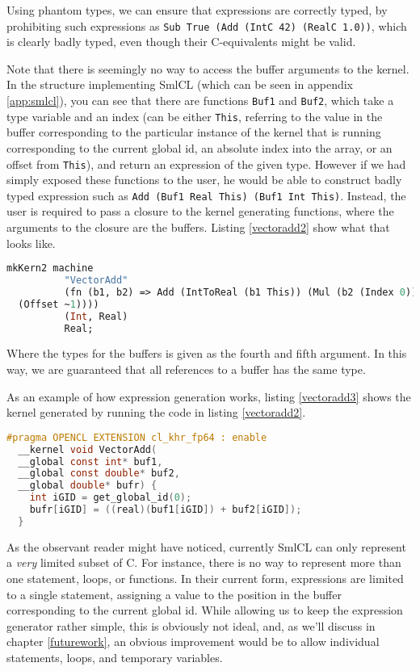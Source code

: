 Using phantom types, we can ensure that expressions are correctly
typed, by prohibiting such expressions as \texttt{Sub True (Add (IntC
  42) (RealC 1.0))}, which is clearly badly typed, even though their
C-equivalents might be valid.

Note that there is seemingly no way to access the buffer arguments to
the kernel. In the structure implementing SmlCL (which can be seen in
appendix \ref{app:smlcl}), you can see that there are functions
\texttt{Buf1} and \texttt{Buf2}, which take a type variable and an
index (can be either \texttt{This}, referring to the value in the
buffer corresponding to the particular instance of the kernel that is
running corresponding to the current global id, an absolute index into
the array, or an offset from \texttt{This}), and return an expression
of the given type. However if we had simply exposed these functions to
the user, he would be able to construct badly typed expression such as
\texttt{Add (Buf1 Real This) (Buf1 Int This)}. Instead, the user is
required to pass a closure to the kernel generating functions, where
the arguments to the closure are the buffers. Listing \ref{vectoradd2}
show what that looks like.

\begin{lstlisting}[mathescape,language=ML,caption=Expressing VectorAdd
  using SmlCLs expression generating capabilities.,label=vectoradd2]
  mkKern2 machine
          "VectorAdd"
          (fn (b1, b2) => Add (IntToReal (b1 This)) (Mul (b2 (Index 0)) (b2
  (Offset ~1))))
          (Int, Real)
          Real;
\end{lstlisting}

Where the types for the buffers is given as the fourth and fifth
argument. In this way, we are guaranteed that all references to a buffer
has the same type.

As an example of how expression generation works, listing
\ref{vectoradd3} shows the kernel generated by running the code in
listing \ref{vectoradd2}.

\begin{lstlisting}[mathescape,language=C,caption=VectorAdd as
    generated by SmlCL.,label=vectoradd3]
  #pragma OPENCL EXTENSION cl_khr_fp64 : enable
  __kernel void VectorAdd(
  __global const int* buf1,
  __global const double* buf2,
  __global double* bufr) {
    int iGID = get_global_id(0);
    bufr[iGID] = ((real)(buf1[iGID]) + buf2[iGID]);
  }
\end{lstlisting}

As the observant reader might have noticed, currently SmlCL can only
represent a \emph{very} limited subset of C. For instance, there is no
way to represent more than one statement, loops, or functions. In
their current form, expressions are limited to a single statement,
assigning a value to the position in the buffer corresponding to the
current global id. While allowing us to keep the expression generator
rather simple, this is obviously not ideal, and, as we'll discuss in
chapter \ref{futurework}, an obvious improvement would be to allow
individual statements, loops, and temporary variables.

